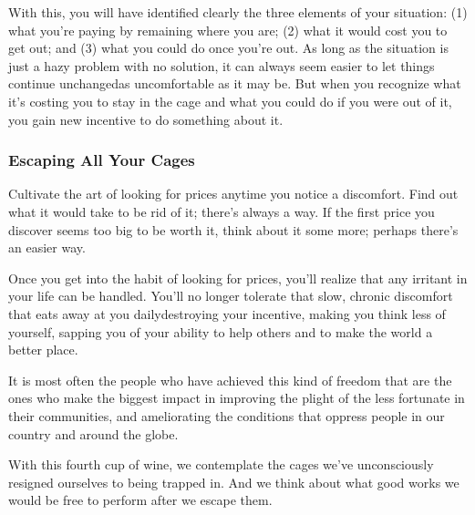 {  With this, you will have identified clearly the three elements of your
  situation: (1) what you're paying by remaining where you are; (2) what it
  would cost you to get out; and (3) what you could do once you're out. As long
  as the situation is just a hazy problem with no solution, it can always seem
  easier to let things continue unchanged\textemdash{}as uncomfortable as it may
  be. But when you recognize what it's costing you to stay in the cage and what
  you could do if you were out of it, you gain new incentive to do something
  about it.

  \subsubsection*{Escaping All Your Cages}
  \newReading Cultivate the art of looking for prices anytime you notice a
  discomfort. Find out what it would take to be rid of it; there's always a way.
  If the first price you discover seems too big to be worth it, think about it
  some more; perhaps there's an easier way.

  Once you get into the habit of looking for prices, you'll realize that any
  irritant in your life can be handled. You'll no longer tolerate that slow,
  chronic discomfort that eats away at you daily\textemdash{}destroying your
  incentive, making you think less of yourself, sapping you of your ability to
  help others and to make the world a better place.

  It is most often the people who have achieved this kind of freedom that are
  the ones who make the biggest impact in improving the plight of the less
  fortunate in their communities, and ameliorating the conditions that oppress
  people in our country and around the globe.

  With this fourth cup of wine, we contemplate the cages we've unconsciously
  resigned ourselves to being trapped in. And we think about what good works we
  would be free to perform after we escape them.
}
